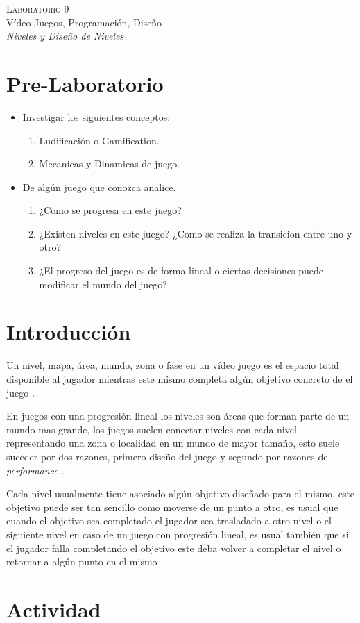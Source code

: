 \begin{center}
\textsc{\Large Laboratorio 9}~\\
{\large Vídeo Juegos, Programación, Diseño}~\\
\emph{Niveles y Diseño de Niveles}
\end{center}

\section{Pre-Laboratorio}
\begin{itemize}
\item Investigar los siguientes conceptos:
\begin{enumerate}
  \item Ludificación o Gamification.
  \item Mecanicas y Dinamicas de juego.
\end{enumerate}
\item De algún juego que conozca analice.
\begin{enumerate}
  \item ¿Como se progresa en este juego?
  \item ¿Existen niveles en este juego? ¿Como se realiza la transicion entre uno y otro?
  \item ¿El progreso del juego es de forma lineal o ciertas decisiones puede modificar el mundo del juego?
\end{enumerate}
\end{itemize}

\section{Introducción}
Un nivel, mapa, área, mundo, zona o fase en un vídeo juego es el espacio total disponible al jugador  mientras este mismo completa algún objetivo concreto de el juego \cite[p.~107]{bobbatesgamedesign}.

En juegos con una progresión lineal los niveles son áreas que forman parte de un mundo mas grande, los juegos suelen conectar niveles con cada nivel representando una zona o localidad en un mundo de mayor tamaño, esto suele suceder por dos razones, primero diseño del juego y segundo por razones de \emph{performance} \cite[p.~104]{jenkinscreatinggames}.

Cada nivel usualmente tiene asociado algún objetivo diseñado para el mismo, este objetivo puede ser tan sencillo como moverse de un punto a otro, es usual que cuando el objetivo sea completado el jugador sea trasladado a otro nivel o el siguiente nivel en caso de un juego con progresión lineal, es usual también que si el jugador falla completando el objetivo este deba volver a completar el nivel o retornar a algún punto en el mismo \cite[p.~111]{bobbatesgamedesign}.
\section{Actividad}
